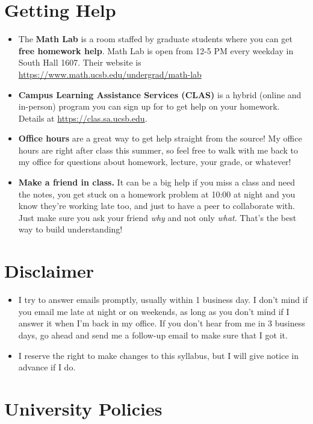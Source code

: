 \documentclass[11pt,letterpaper]{article}
\begin{document}
\section*{Getting Help}
\begin{itemize}[nosep]
\item The \textbf{Math Lab} is a room staffed by graduate students where you can get \textbf{free homework help}. Math Lab is open from 12-5 PM every weekday in South Hall 1607. Their website is \\
\href{https://www.math.ucsb.edu/undergrad/math-lab}{https://www.math.ucsb.edu/undergrad/math-lab}
\item \textbf{Campus Learning Assistance Services (CLAS)} is a hybrid (online and in-person) program you can sign up for to get help on your homework. Details at \href{https://clas.sa.ucsb.edu}{https://clas.sa.ucsb.edu}.
\item \textbf{Office hours} are a great way to get help straight from the source! My office hours are right after class this summer, so feel free to walk with me back to my office for questions about homework, lecture, your grade, or whatever!
\item \textbf{Make a friend in class.} It can be a big help if you miss a class and need the notes, you get stuck on a homework problem at 10:00 at night and you know they're working late too, and just to have a peer to collaborate with. Just make sure you ask your friend \textit{why} and not only \textit{what}. That's the best way to build understanding!
\end{itemize}

\pagebreak

\section*{Disclaimer}
\begin{itemize}[nosep]
\item I try to answer emails promptly, usually within 1 business day. I don't mind if you email me late at night or on weekends, as long as you don't mind if I answer it when I'm back in my office. If you don't hear from me in 3 business days, go ahead and send me a follow-up email to make sure that I got it. 
\item I reserve the right to make changes to this syllabus, but I will give notice in advance if I do. 
\end{itemize}

\section*{University Policies}
\end{document}
